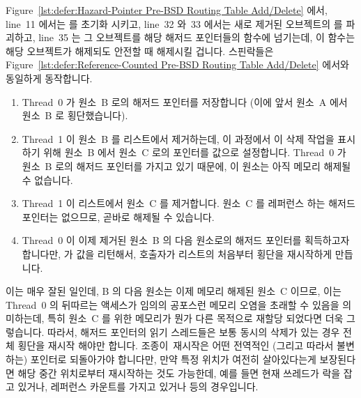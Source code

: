 Figure~\ref{lst:defer:Hazard-Pointer Pre-BSD Routing Table Add/Delete}
에서, line~11 에서는  를 초기화 시키고, line~32 와~33 에서는
새로 제거된 오브젝트의  를 파괴하고, line~35 는 그 오브젝트를
해당 해저드 포인터들의  함수에 넘기는데, 이 함수는 해당
오브젝트가 해제되도 안전할 때 해제시킬 겁니다.
스핀락들은
Figure~\ref{lst:defer:Reference-Counted Pre-BSD Routing Table Add/Delete}
에서와 동일하게 동작합니다.
\iffalse

\begin{enumerate}
\item	Thread~0 가 원소~B 로의 해저드 포인터를 저장합니다 (이에 앞서 원소~A
	에서 원소~B 로 횡단했습니다).
\item	Thread~1 이 원소~B 를 리스트에서 제거하는데, 이 과정에서 이 삭제 작업을
	표시하기 위해 원소~B 에서 원소~C 로의 포인터를 
	값으로 설정합니다.
	Thread~0 가 원소~B 로의 해저드 포인터를 가지고 있기 때문에, 이 원소는
	아직 메모리 해제될 수 없습니다.
\item	Thread~1 이 리스트에서 원소~C 를 제거합니다.
	원소~C 를 레퍼런스 하는 해저드 포인터는 없으므로, 곧바로 해제될 수
	있습니다.
\item	Thread~0 이 이제 제거된 원소~B 의 다음 원소로의 해저드 포인터를
	획득하고자 합니다만,  가  값을
	리턴해서, 호출자가 리스트의 처음부터 횡단을 재시작하게 만듭니다.

\end{enumerate}

이는 매우 잘된 일인데, B 의 다음 원소는 이제 메모리 해제된 원소~C 이므로, 이는
Thread~0 의 뒤따르는 액세스가 임의의 공포스런 메모리 오염을 초래할 수 있음을
의미하는데, 특히 원소~C 를 위한 메모리가 뭔가 다른 목적으로 재할당 되었다면
더욱 그렇습니다.
따라서, 해저드 포인터의 읽기 스레드들은 보통 동시의 삭제가 있는 경우 전체
횡단을 재시작 해야만 합니다.
조종이 재시작은 어떤 전역적인 (그리고 따라서 불변하는) 포인터로 되돌아가야
합니다만, 만약 특정 위치가 여전히 살아있다는게 보장된다면 해당 중간 위치로부터
재시작하는 것도 가능한데, 예를 들면 현재 쓰레드가 락을 잡고 있거나, 레퍼런스
카운트를 가지고 있거나 등의 경우입니다.
\iffalse

